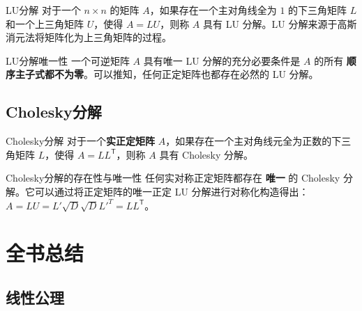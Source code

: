 \documentclass[a4paper,12pt]{ctexart}
\begin{document}
\begin{mydef}{LU分解}{}
对于一个 $n \times n$ 的矩阵 $A$，如果存在一个主对角线全为 $1$ 的下三角矩阵 $L$ 和一个上三角矩阵 $U$，使得 $A = LU$，则称 $A$ 具有 LU 分解。LU 分解来源于高斯消元法将矩阵化为上三角矩阵的过程。
\end{mydef}

\begin{mythm}{LU分解唯一性}{}
一个可逆矩阵 $A$ 具有唯一 LU 分解的充分必要条件是 $A$ 的所有 \textbf{顺序主子式都不为零}。可以推知，任何正定矩阵也都存在必然的 LU 分解。
\end{mythm}

\subsection{Cholesky分解}

\begin{mydef}{Cholesky分解}{}
对于一个\textbf{实正定矩阵} $A$，如果存在一个主对角线元全为正数的下三角矩阵 $L$，使得 $A = LL^{\mathsf{T}}$，则称 $A$ 具有 Cholesky 分解。
\end{mydef}

\begin{mythm}{Cholesky分解的存在性与唯一性}{}
任何实对称正定矩阵都存在 \textbf{唯一} 的 Cholesky 分解。它可以通过将正定矩阵的唯一正定 LU 分解进行对称化构造得出：$A=LU=L'\sqrt{D}\sqrt{D}L'^T = LL^{\mathsf{T}}$。
\end{mythm}

\section{全书总结}

\subsection{线性公理}
\end{document}

